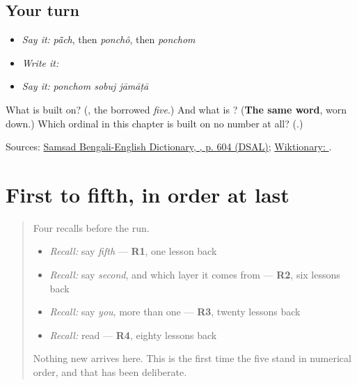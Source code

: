 \subsection*{Your turn}
\begin{itemize}
\raggedright
  \item \emph{Say it:} \emph{pā̃ch}, then \emph{ponchô}, then \emph{ponchom}
  \item \emph{Write it:} 
  \item \emph{Say it:} \emph{ponchom sobuj jāmāṭā}
\end{itemize}

\begin{tcolorbox}[breakable,colback=teal!4,colframe=teal!35!black,title={Before you move on}]
What is \textbf{} built on? (\textbf{}, the borrowed \emph{five}.) And what is \textbf{}? (\textbf{The same word}, worn down.) Which ordinal in this chapter is built on no number at all? (\textbf{}.)

Sources: \href{https://dsal.uchicago.edu/cgi-bin/app/biswas-bengali\_query.py?qs=\%E0\%A6\%AA\%E0\%A6\%9E\%E0\%A7\%8D\%E0\%A6\%9A\&searchhws=yes}{Samsad Bengali-English Dictionary, , p. 604 (DSAL)}; \href{https://en.wiktionary.org/wiki/\%E0\%A6\%AA\%E0\%A6\%BE\%E0\%A6\%81\%E0\%A6\%9A}{Wiktionary: }.
\end{tcolorbox}
\section[Practice]{First to fifth, in order at last}

\label{lesson:BN-R27-first-to-fifth}



\begin{quote}
Four recalls before the run.

\begin{itemize}
\raggedright
  \item \emph{Recall:} say \emph{fifth} — \textbf{R1}, one lesson back
  \item \emph{Recall:} say \emph{second}, and which layer it comes from — \textbf{R2}, six lessons back
  \item \emph{Recall:} say \emph{you}, more than one — \textbf{R3}, twenty lessons back
  \item \emph{Recall:} read \textbf{} — \textbf{R4}, eighty lessons back
\end{itemize}

Nothing new arrives here. This is the first time the five stand in numerical order, and that has been deliberate.
\end{quote}

